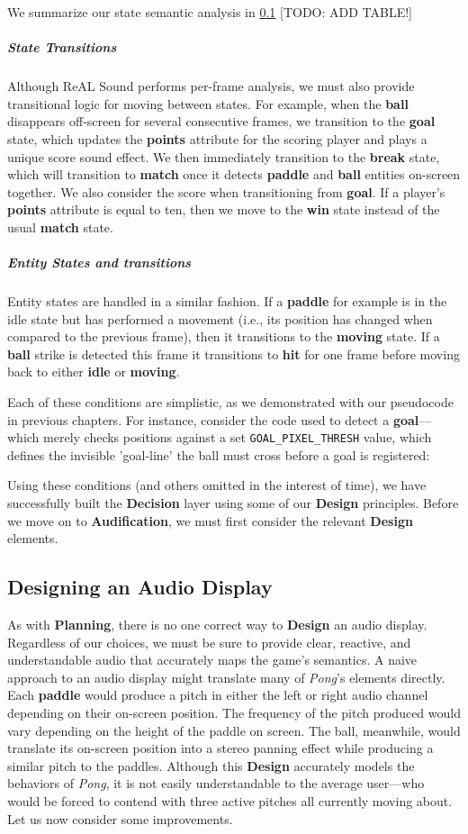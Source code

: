 \documentclass{report}
\newcommand{\rs}{ReAL Sound\xspace}
\newcommand{\plan}{\textbf{Planning}\xspace}
\newcommand{\design}{\textbf{Design}\xspace}
\newcommand{\state}[1]{\textbf{#1}}
\newcommand{\decision}{\textbf{Decision}\xspace}
\newcommand{\audio}{\textbf{Audification}\xspace}
\newcommand{\pad}{\textbf{paddle}\xspace}
\newcommand{\ball}{\textbf{ball}\xspace}
\newcommand{\tech}[1]{\textbf{#1}}
\begin{document}
We summarize our state semantic analysis in \ref{} [TODO: ADD TABLE!]


\subparagraph{State Transitions}
Although \rs performs per-frame analysis, we must also provide transitional logic for moving between states. For example, when the \ball disappears off-screen for several consecutive frames, we transition to the \state{goal} state, which updates the \tech{points} attribute for the scoring player and plays a unique score sound effect. We then immediately transition to the \state{break} state, which will transition to \state{match} once it detects \pad and \ball entities on-screen together. We also consider the score when transitioning from \state{goal}. If a player's \state{points} attribute is equal to ten, then we move to the \state{win} state instead of the usual \state{match} state.

\subparagraph{Entity States and transitions}
Entity states are handled in a similar fashion. If a \pad for example is in the idle state but has performed a movement (i.e., its position has changed when compared to the previous frame), then it transitions to the \state{moving} state. If a \ball strike is detected this frame it transitions to \state{hit} for one frame before moving back to either \state{idle} or \state{moving}.

Each of these conditions are simplistic, as we demonstrated with our pseudocode in previous chapters. For instance, consider the code used to detect a \state{goal}---which merely checks positions against a set \texttt{GOAL\_PIXEL\_THRESH} value, which defines the invisible 'goal-line' the ball must cross before a goal is registered:




Using these conditions (and others omitted in the interest of time), we have successfully built the \decision layer using some of our \design principles. Before we move on to \audio, we must first consider the relevant \design elements. 

\subsection{Designing an Audio Display}
As with \plan, there is no one correct way to \design an audio display. Regardless of our choices, we must be sure to provide clear, reactive, and understandable audio that accurately maps the game's semantics. A naive approach to an audio display might translate many of \emph{Pong}'s elements directly. Each \pad would produce a pitch in either the left or right audio channel depending on their on-screen position. The frequency of the pitch produced would vary depending on the height of the paddle on screen. The ball, meanwhile, would translate its on-screen position into a stereo panning effect while producing a similar pitch to the paddles. Although this \design accurately models the behaviors of \emph{Pong}, it is not easily understandable to the average user---who would be forced to contend with three active pitches all currently moving about. Let us now consider some improvements.
\end{document}
